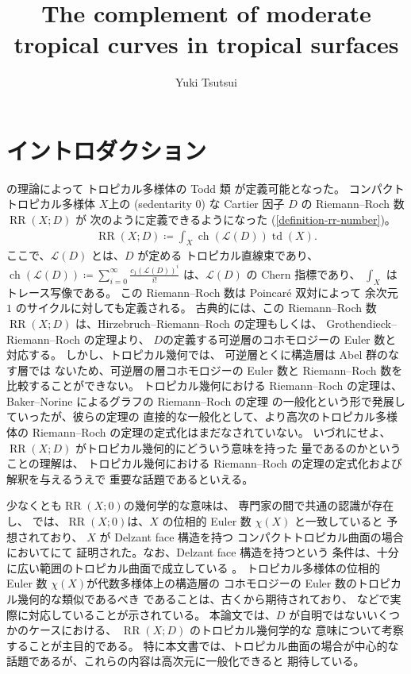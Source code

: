 \documentclass[a4paper,dvipdfmx,reqno,12pt]{amsart}
\title{The complement of moderate tropical curves in
tropical surfaces}
\author[Y. Tsutsui]{Yuki Tsutsui}
\theoremstyle{definition}
\newcommand{\deq}{\coloneqq}
\newcommand{\opn}[1]{\operatorname{#1}}
\numberwithin{equation}{section}
\begin{document}
\maketitle

\begin{abstract}
     
\end{abstract}
\section{イントロダクション}

\cite{demedrano2023chern}の理論によって
トロピカル多様体の Todd 類 が定義可能となった。
コンパクトトロピカル多様体
$X$上の (sedentarity 0) な Cartier 因子 $D$ の
Riemann--Roch 数 $\opn{RR}(X;D)$ が
次のように定義できるようになった
(\cref{definition-rr-number})。
\begin{align}
\opn{RR}(X;D)\deq 
\int_{X}\opn{ch}(\mathcal{L}(D))\opn{td}(X).
\end{align}
ここで、$\mathcal{L}(D)$ とは、$D$ が定める
トロピカル直線束であり、
$\opn{ch}(\mathcal{L}(D))\deq 
\sum_{i=0}^{\infty}\frac{c_1(\mathcal{L}(D))^{i}}{i!}$
は、$\mathcal{L}(D)$ の Chern 指標であり、
$\int_X$ はトレース写像である。
この Riemann--Roch 数は Poincar\'e 双対によって
余次元 $1$ のサイクルに対しても定義される。
古典的には、この Riemann--Roch 数 $\opn{RR}(X;D)$
は、Hirzebruch--Riemann--Roch の定理もしくは、
Grothendieck--Riemann--Roch の定理より、
$D$の定義する可逆層のコホモロジーの Euler 数と対応する。
しかし、トロピカル幾何では、
可逆層とくに構造層は Abel 群のなす層では
ないため、可逆層の層コホモロジーの Euler 数と
Riemann--Roch 数を比較することができない。
トロピカル幾何における Riemann--Roch の定理は、
Baker--Norine によるグラフの Riemann--Roch の定理
の一般化という形で発展していったが、彼らの定理の
直接的な一般化として、より高次のトロピカル多様体の
Riemann--Roch の定理の定式化はまだなされていない。
いづれにせよ、
$\opn{RR}(X;D)$ がトロピカル幾何的にどういう意味を持った
量であるのかということの理解は、
トロピカル幾何における
Riemann--Roch の定理の定式化および解釈を与えるうえで
重要な話題であるといえる。

少なくとも$\opn{RR}(X;0)$の幾何学的な意味は、
専門家の間で共通の認識が存在し、
\cite[Conjecture 6.13]{demedrano2023chern}
では、$\opn{RR}(X;0)$は、$X$
の位相的 Euler 数 $\chi(X)$ と一致していると
予想されており、
$X$ が Delzant face 構造を持つ
コンパクトトロピカル曲面の場合
において\cite[Theorem 6.3]{demedrano2023chern}にて
証明された。なお、Delzant face 構造を持つという
条件は、十分に広い範囲のトロピカル曲面で成立している
\cite[Corollary 6.11]{demedrano2023chern}。
トロピカル多様体の位相的 Euler 数
$\chi(X)$が代数多様体上の構造層の
コホモロジーの Euler 数のトロピカル幾何的な類似であるべき
であることは、古くから期待されており、
\cite[Corollary 2]{MR3961331}
などで実際に対応していることが示されている。
本論文では、$D$ が自明ではないいくつかのケースにおける、
$\opn{RR}(X;D)$ のトロピカル幾何学的な
意味について考察することが主目的である。
特に本文書では、トロピカル曲面の場合が中心的な
話題であるが、これらの内容は高次元に一般化できると
期待している。
\end{document}
